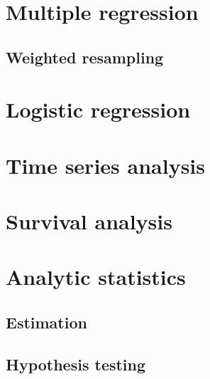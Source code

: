 \documentclass[12pt]{book}
\begin{document}
\chapter{Multiple regression}

\section{Weighted resampling}


\chapter{Logistic regression}


\chapter{Time series analysis}



\chapter{Survival analysis}


\chapter{Analytic statistics}

\section{Estimation}

\section{Hypothesis testing}


\printindex

\clearemptydoublepage
\end{document}
